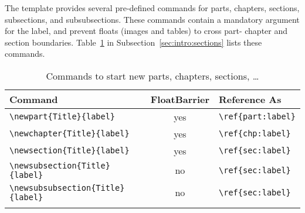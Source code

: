 
The template provides several pre-defined commands for parts, chapters, sections, subsections, and subsubsections. These commands contain a mandatory argument for the label, and prevent floats (images and tables) to cross part- chapter and section boundaries. Table~\ref{tab:intro:sections:commands} in Subsection~\ref{sec:intro:sections} lists these commands.

\begin{longtable}{l|c|l}
  \textbf{Command} & \textbf{FloatBarrier} & \textbf{Reference As} \\\hline
  \verb|\newpart{Title}{label}| & yes & \verb|\ref{part:label}| \\
  \verb|\newchapter{Title}{label}| & yes & \verb|\ref{chp:label}| \\
  \verb|\newsection{Title}{label}| & yes & \verb|\ref{sec:label}| \\
  \verb|\newsubsection{Title}{label}| & no & \verb|\ref{sec:label}| \\
  \verb|\newsubsubsection{Title}{label}| & no & \verb|\ref{sec:label}| \\
  \caption{Commands to start new parts, chapters, sections, \dots}
  \label{tab:intro:sections:commands}
\end{longtable}





